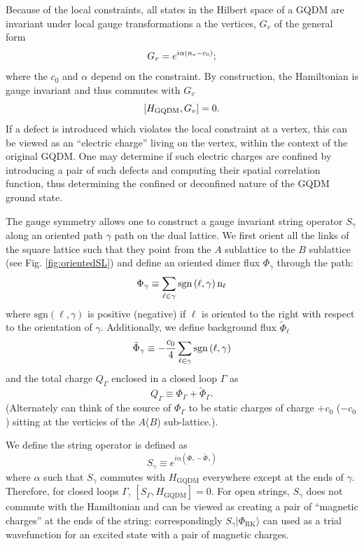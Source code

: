 \documentclass[twocolumn,prb,aps,floatfix,superscriptaddress]{revtex4-1}
\newcommand{\figref}[1]{Fig. \ref{#1}}
\newcommand{\ket}[1]{| #1 \rangle}
\newcommand{\RK}{\mathrm{RK}}
\newcommand{\HGQDM}{H_\mathrm{GQDM}}
\begin{document}
Because of the local constraints, all states in the Hilbert space of a GQDM are invariant under local gauge transformations a the vertices, $G_v$ of the general form~\cite{Moessner2001}
\begin{equation}
G_v = e^{i \alpha \left( n_v -c_0 \right)}; \notag
\end{equation}
where the $c_0$ and $\alpha$ depend on the constraint.  
By construction, the Hamiltonian is gauge invariant and thus commutes with $G_v$
\begin{equation}
\left[ H_{\rm{GQDM}}, G_v \right] = 0. \notag
\end{equation}
If a defect is introduced which violates the local constraint at a vertex, this can be viewed as an ``electric charge'' living on the vertex, within the context of the original GQDM. One may determine if such electric charges are confined by introducing a pair of such defects and computing their spatial correlation function, thus determining the confined or deconfined nature of the GQDM ground state.

The gauge symmetry allows one to construct a gauge invariant string operator $S_\gamma$ along an oriented path $\gamma$ path on the dual lattice. We first orient all the links of the square lattice such that they point from the $A$ sublattice to the $B$ sublattice (see \figref{fig:orientedSL}) and define an oriented dimer flux $\Phi_\gamma$ through the path:
\begin{equation}
\Phi_\gamma \equiv \sum_{\ell \in \gamma} \rm{sgn}\left(\ell,\gamma\right) n_\ell
\end{equation}
where $\mathrm{sgn}(\ell,\gamma)$ is positive (negative) if $\ell$ is oriented to the right with respect to the orientation of $\gamma$. Additionally, we define background flux $\tilde{\Phi}_\ell$
\begin{equation}
\tilde{\Phi}_\gamma \equiv -\frac{c_0}{4} \sum_{\ell \in \gamma} \rm{sgn}\left(\ell,\gamma\right) 
\end{equation}
and the total charge $Q_\Gamma$ enclosed in a closed loop $\Gamma$ as
\begin{equation}
Q_\Gamma \equiv \Phi_\Gamma+ \tilde{\Phi}_\Gamma.
\end{equation}
(Alternately can think of the source of $\Phi_\Gamma$ to be static charges of charge $+c_0$ ($-c_0$) sitting at the verticies of the $A$($B$) sub-lattice.).

We define the string operator is defined as
\begin{equation}
S_\gamma \equiv e^{i \alpha \left( \Phi_\gamma - \tilde{\Phi}_\gamma \right)}
\end{equation}
where $\alpha$ such that $S_\gamma$ commutes with $\HGQDM$ everywhere except at the ends of $\gamma$. Therefore, for closed loops $\Gamma$, $[ S_\Gamma,\HGQDM]=0$. For open strings, $S_\gamma$ does not commute with the Hamiltonian and can be viewed as creating a pair of ``magnetic charges'' at the ends of the string: correspondingly $S_\gamma \ket{\Phi_{\RK}}$ can used as a trial wavefunction for an excited state with a pair of magnetic charges.
\end{document}
